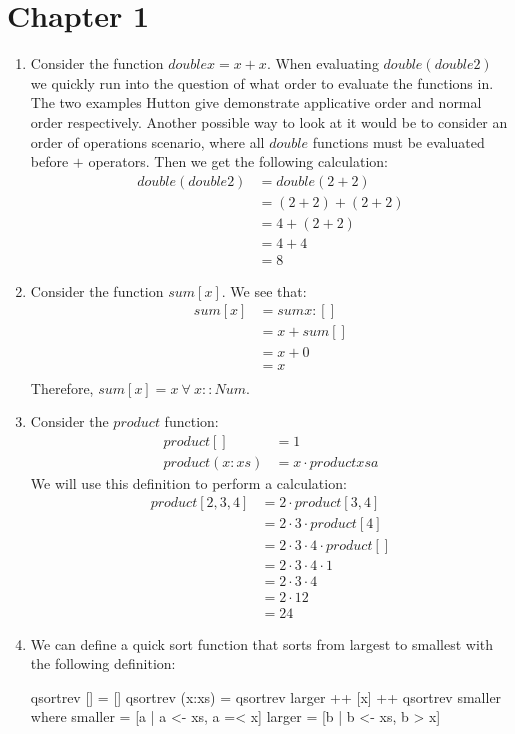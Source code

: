 \documentclass{article}
\begin{document}
\section{Chapter 1}
\begin{enumerate}
\item Consider the function $double x = x + x$. When evaluating $double ( double 2)$ we quickly run into the question of what order to evaluate the functions in. The two examples Hutton give demonstrate applicative order and normal order respectively. Another possible way to look at it would be to consider an order of operations scenario, where all $double$ functions must be evaluated before $+$ operators. Then we get the following calculation:
\begin{align*}
double ( double 2) &= double ( 2 + 2)\\
&= (2 +2 ) +(2+2)\\
&=4 + (2 + 2)\\
&= 4 + 4\\
&= 8
\end{align*}

\item Consider the function $sum [x]$. We see that:
\begin{align*}
sum[x] &= sum x:[]\\
&= x + sum[]\\
&= x + 0\\
&= x\\
\end{align*}
Therefore, $sum [x] = x \ \forall \ x :: Num$.

\item Consider the $product$ function:
\begin{align*}
product [] &= 1\\
product (x:xs) &= x \cdot product xsa
\end{align*}
We will use this definition to perform a calculation:
\begin{align*}
product [2,3,4] &= 2 \cdot product [3,4]\\
&= 2 \cdot 3 \cdot product [4]\\
&= 2 \cdot 3 \cdot 4 \cdot product []\\
&= 2 \cdot 3 \cdot 4 \cdot 1\\
&= 2 \cdot 3 \cdot 4 \\
&= 2 \cdot 12\\
&= 24
\end{align*}

\item We can define a quick sort function that sorts from largest to smallest with the following definition:
\begin{code}
    qsortrev [] = []
qsortrev (x:xs) = qsortrev  larger ++ [x] ++ qsortrev  smaller
                          where 
                             smaller = [a | a <- xs, a =< x]
                             larger = [b | b <- xs, b > x] 
\end{code}


\end{enumerate}
\end{document}
